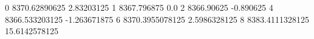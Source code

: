 0 8370.62890625 2.83203125
1 8367.796875 0.0
2 8366.90625 -0.890625
4 8366.533203125 -1.263671875
6 8370.3955078125 2.5986328125
8 8383.4111328125 15.6142578125
